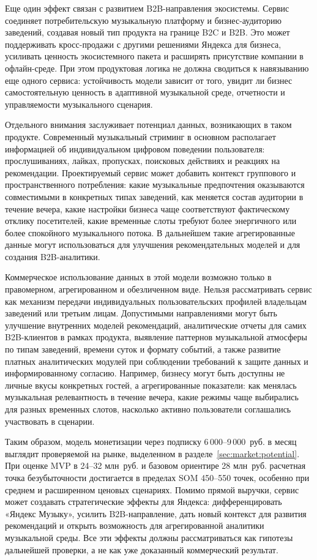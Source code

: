 Еще один эффект связан с развитием B2B-направления экосистемы. Сервис соединяет потребительскую музыкальную платформу и бизнес-аудиторию заведений, создавая новый тип продукта на границе B2C и B2B. Это может поддерживать кросс-продажи с другими решениями Яндекса для бизнеса, усиливать ценность экосистемного пакета и расширять присутствие компании в офлайн-среде. При этом продуктовая логика не должна сводиться к навязыванию еще одного сервиса: устойчивость модели зависит от того, увидит ли бизнес самостоятельную ценность в адаптивной музыкальной среде, отчетности и управляемости музыкального сценария.

Отдельного внимания заслуживает потенциал данных, возникающих в таком продукте. Современный музыкальный стриминг в основном располагает информацией об индивидуальном цифровом поведении пользователя: прослушиваниях, лайках, пропусках, поисковых действиях и реакциях на рекомендации. Проектируемый сервис может добавить контекст группового и пространственного потребления: какие музыкальные предпочтения оказываются совместимыми в конкретных типах заведений, как меняется состав аудитории в течение вечера, какие настройки бизнеса чаще соответствуют фактическому отклику посетителей, какие временные слоты требуют более энергичного или более спокойного музыкального потока. В дальнейшем такие агрегированные данные могут использоваться для улучшения рекомендательных моделей и для создания B2B-аналитики.

Коммерческое использование данных в этой модели возможно только в правомерном, агрегированном и обезличенном виде. Нельзя рассматривать сервис как механизм передачи индивидуальных пользовательских профилей владельцам заведений или третьим лицам. Допустимыми направлениями могут быть улучшение внутренних моделей рекомендаций, аналитические отчеты для самих B2B-клиентов в рамках продукта, выявление паттернов музыкальной атмосферы по типам заведений, времени суток и формату событий, а также развитие платных аналитических модулей при соблюдении требований к защите данных и информированному согласию. Например, бизнесу могут быть доступны не личные вкусы конкретных гостей, а агрегированные показатели: как менялась музыкальная релевантность в течение вечера, какие режимы чаще выбирались для разных временных слотов, насколько активно пользователи соглашались участвовать в сценарии.

Таким образом, модель монетизации через подписку 6\,000--9\,000~руб. в месяц выглядит проверяемой на рынке, выделенном в разделе~\ref{sec:market:potential}. При оценке MVP в 24--32 млн~руб. и базовом ориентире 28 млн~руб. расчетная точка безубыточности достигается в пределах SOM 450--550 точек, особенно при среднем и расширенном ценовых сценариях. Помимо прямой выручки, сервис может создавать стратегические эффекты для Яндекса: дифференцировать «Яндекс Музыку», усилить B2B-направление, дать новый контекст для развития рекомендаций и открыть возможность для агрегированной аналитики музыкальной среды. Все эти эффекты должны рассматриваться как гипотезы дальнейшей проверки, а не как уже доказанный коммерческий результат.


